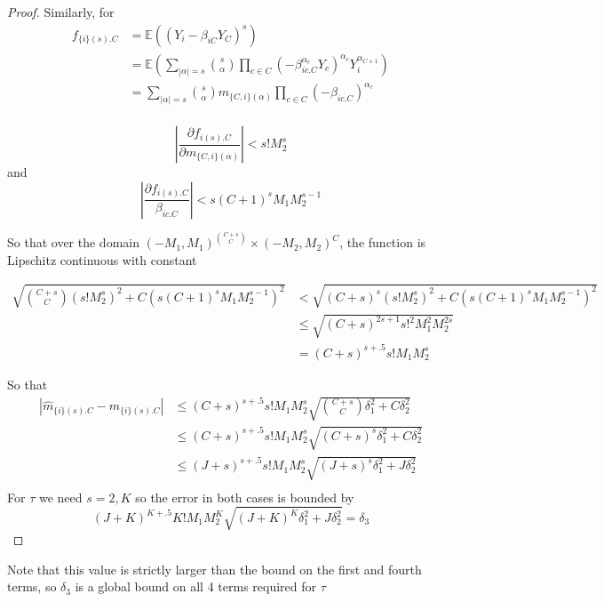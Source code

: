 \documentclass[]{article}
\newcommand{\E}{\mathbb{E}}
\begin{document}
\begin{proof}

Similarly, for
\begin{equation}
\begin{aligned}
f_{\{i\}(s).C} &= \E\left((Y_i - \beta_{iC}Y_C)^s\right) 
\\
&= \E\left(\sum_{|\alpha| = s} {s \choose \alpha} \prod_{c \in C}(-\beta_{ic.C}^{\alpha_c}Y_c)^{\alpha_c} Y_i^{\alpha_{C+1}}\right)\\
&= \sum_{|\alpha| = s} {s \choose \alpha} m_{\{C,i\}(\alpha)} \prod_{c \in C}(-\beta_{ic.C})^{\alpha_c}\\
\end{aligned}
\end{equation}


\[\left|\frac{\partial f_{i(s).C}}{\partial m_{\{C,i\}(\alpha)}} \right| < s! M_2^{s}\] 
and
\[\left|\frac{\partial f_{i(s).C}}{\beta_{ic.C}} \right| < s(C+1)^s M_1 M_2^{s-1} \] 

So that over the domain $(-M_1, M_1)^{{C + s \choose C}} \times (-M_2, M_2)^{C}$, the function is Lipschitz continuous with constant

\begin{equation}
\begin{aligned}
\sqrt{{C + s \choose C} \left(s! M_2^s\right)^2 + C\left(s(C+1)^s M_1 M_2^{s-1}\right)^2} &< \sqrt{(C+s)^s\left(s!M_2^s\right)^2 + C\left(s(C+1)^s M_1 M_2^{s-1}\right)^2} 
\\
& \leq \sqrt{(C+s)^{2s+1}s!^2M_1^2M_2^{2s}}\\
& = (C+s)^{s + .5}s!M_1M_2^s
\end{aligned}
\end{equation}

So that 
\begin{equation}
\begin{aligned}
|\hat m_{\{i\}(s).C} - m_{\{i\}(s).C}| &\leq (C+s)^{s + .5}s!M_1M_2^s \sqrt{{C + s \choose C}\delta_1^2 + C\delta_2^2}
\\
& \leq (C+s)^{s + .5}s!M_1M_2^s \sqrt{(C+s)^s\delta_1^2 + C \delta_2^2}\\
& \leq (J+s)^{s + .5}s!M_1M_2^s \sqrt{(J + s)^s\delta_1^2 + J \delta_2^2}\\
\end{aligned}
\end{equation}
For $\tau$ we need $s = 2, K$ so the error in both cases is bounded by
\[(J +K)^{K + .5}K!M_1M_2^K \sqrt{(J+K)^K\delta_1^2 + J \delta_2^2} = \delta_3\]

\end{proof}
Note that this value is strictly larger than the bound on the first and fourth terms, so $\delta_3$ is a global bound on all 4 terms required for $\tau$
\end{document}
